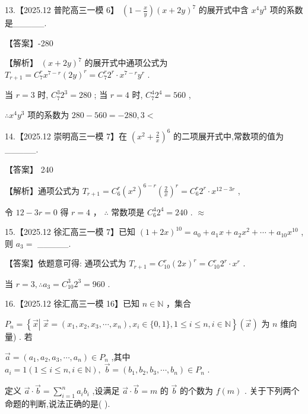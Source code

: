 \documentclass[10pt]{article}
\begin{document}
13.【2025.12 普陀高三一模 6】 \(\left( {1 - \frac{x}{y}}\right) {\left( x + 2y\right) }^{7}\) 的展开式中含 \({x}^{4}{y}^{3}\) 项的系数是\_\_\_\_\_.

【答案】-280

【解析】 \({\left( x + 2y\right) }^{7}\) 的展开式中通项公式为 \({T}_{r + 1} = {C}_{7}^{r}{x}^{7 - r}{\left( 2y\right) }^{r} = {C}_{7}^{r}{2}^{r} \cdot  {x}^{7 - r}{y}^{r}\) .

当 \(r = 3\) 时, \({C}_{7}^{3}{2}^{3} = {280}\) ; 当 \(r = 4\) 时, \({C}_{7}^{4}{2}^{4} = {560}\) ,

\(\therefore {x}^{4}{y}^{3}\) 项的系数为 \({280} - {560} =  - {280},3 <\)

14.【2025.12 崇明高三一模 7】在 \({\left( {x}^{2} + \frac{2}{x}\right) }^{6}\) 的二项展开式中,常数项的值为\_\_\_\_\_.

【答案】 240

【解析】通项公式为 \({T}_{r + 1} = {C}_{6}^{r}{\left( {x}^{2}\right) }^{6 - r}{\left( \frac{2}{x}\right) }^{r} = {C}_{6}^{r}{2}^{r} \cdot  {x}^{{12} - {3r}}\) ,

令 \({12} - {3r} = 0\) 得 \(r = 4\) ， \(\therefore\) 常数项是 \({C}_{6}^{4}{2}^{4} = {240}\) . \(\approx\)

15.【2025.12 徐汇高三一模 7】已知 \({\left( 1 + 2x\right) }^{10} = {a}_{0} + {a}_{1}x + {a}_{2}{x}^{2} + \cdots  + {a}_{10}{x}^{10}\) ,则 \({a}_{3} =\) \_\_\_\_\_.

【答案】依题意可得: 通项公式为 \({T}_{r + 1} = {C}_{10}^{r}{\left( 2x\right) }^{r} = {C}_{10}^{r}{2}^{r} \cdot  {x}^{r}\) .

当 \(r = 3,\therefore {a}_{3} = {C}_{10}^{3}{2}^{3} = {960}\) .

16.【2025.12 徐汇高三一模 16】已知 \(n \in  \mathbb{N}\) ，集合

\({P}_{n} = \left\{  {\overrightarrow{x}\left| {\;\overrightarrow{x} = \left( {{x}_{1},{x}_{2},{x}_{3},\cdots ,{x}_{n}}\right) }\right. ,{x}_{i} \in  \{ 0,1\} ,1 \leq  i \leq  n,i \in  \mathbb{N}}\right\}  \left( \overrightarrow{x}\right)\) 为 \(n\) 维向量) . 若

\(\overrightarrow{a} = \left( {{a}_{1},{a}_{2},{a}_{3},\cdots ,{a}_{n}}\right)  \in  {P}_{n}\) ,其中 \({a}_{i} = 1\left( {1 \leq  i \leq  n,i \in  \mathbb{N}}\right) ,\;\overrightarrow{b} = \left( {{b}_{1},{b}_{2},{b}_{3},\cdots ,{b}_{n}}\right)  \in  {P}_{n}\) .

定义 \(\overrightarrow{a} \cdot  \overrightarrow{b} = \mathop{\sum }\limits_{{i = 1}}^{n}{a}_{i}{b}_{i}\) ,设满足 \(\overrightarrow{a} \cdot  \overrightarrow{b} = m\) 的 \(\overrightarrow{b}\) 的个数为 \(f\left( m\right)\) . 关于下列两个命题的判断,说法正确的是( ).
\end{document}

